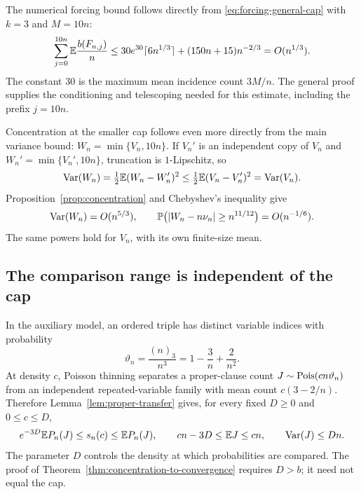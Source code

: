 The numerical forcing bound follows directly from
\eqref{eq:forcing-general-cap} with \(k=3\) and \(M=10n\):
\begin{equation}\label{eq:three-forcing}
 \sum_{j=0}^{10n}\mathbb E\frac{b(F_{n,j})}{n}
 \le30e^{30}\lceil6n^{1/3}\rceil
       +(150n+15)n^{-2/3}
 =O(n^{1/3}).
\end{equation}
The constant \(30\) is the maximum mean incidence count \(3M/n\).
The general proof supplies the conditioning and telescoping needed
for this estimate, including the prefix \(j=10n\).

Concentration at the smaller cap follows even more directly from the
main variance bound: \(W_n=\min\{V_n,10n\}\). If \(V_n'\) is an
independent copy of \(V_n\) and \(W_n'=\min\{V_n',10n\}\), truncation
is \(1\)-Lipschitz, so
\[
 \operatorname{Var}(W_n)=\tfrac12\mathbb E(W_n-W_n')^2
 \le\tfrac12\mathbb E(V_n-V_n')^2=\operatorname{Var}(V_n).
\]
Proposition~\ref{prop:concentration} and Chebyshev's inequality give
\begin{equation}\label{eq:three-concentration}
 \operatorname{Var}(W_n)=O(n^{5/3}),\qquad
 \mathbb P\bigl(|W_n-n\nu_n|\ge n^{11/12}\bigr)=O(n^{-1/6}).
\end{equation}
The same powers hold for \(V_n\), with its own finite-size mean.

\subsection{The comparison range is independent of the cap}

In the auxiliary model, an ordered triple has distinct variable indices
with probability
\[
 \vartheta_n=\frac{(n)_3}{n^3}=1-\frac3n+\frac2{n^2}.
\]
At density \(c\), Poisson thinning separates a proper-clause count
\(J\sim\operatorname{Pois}(cn\vartheta_n)\) from an independent repeated-variable
family with mean count \(c(3-2/n)\). Therefore
Lemma~\ref{lem:proper-transfer} gives, for every fixed \(D\ge0\) and
\(0\le c\le D\),
\begin{equation}\label{eq:three-density-sandwich}
 e^{-3D}\mathbb E P_n(J)\le s_n(c)\le\mathbb E P_n(J),\qquad
 cn-3D\le\mathbb E J\le cn,\qquad \operatorname{Var}(J)\le Dn.
\end{equation}
The parameter \(D\) controls the density at which probabilities are
compared. The proof of Theorem~\ref{thm:concentration-to-convergence}
requires \(D>b\); it need not equal the cap.

